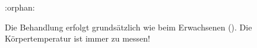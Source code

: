 :orphan:

\label{m:fieberkrampf-kindesalter}
Die Behandlung erfolgt grundsätzlich wie beim Erwachsenen ().
    Die Körpertemperatur ist immer zu messen! 
